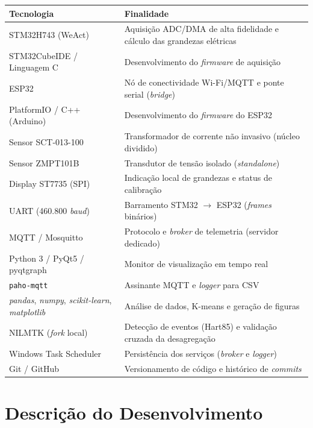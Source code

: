 \documentclass[12pt,a4paper]{article}
\begin{document}
\begin{longtable}{p{5cm} p{9cm}}
\toprule
\textbf{Tecnologia} & \textbf{Finalidade} \\
\midrule
\endhead
STM32H743 (WeAct) & Aquisi\c{c}\~ao ADC/DMA de alta fidelidade e c\'alculo das grandezas el\'etricas \\
STM32CubeIDE / Linguagem C & Desenvolvimento do \textit{firmware} de aquisi\c{c}\~ao \\
ESP32 & N\'o de conectividade Wi-Fi/MQTT e ponte serial (\textit{bridge}) \\
PlatformIO / C++ (Arduino) & Desenvolvimento do \textit{firmware} do ESP32 \\
Sensor SCT-013-100 & Transformador de corrente n\~ao invasivo (n\'ucleo dividido) \\
Sensor ZMPT101B & Transdutor de tens\~ao isolado (\textit{standalone}) \\
Display ST7735 (SPI) & Indica\c{c}\~ao local de grandezas e status de calibra\c{c}\~ao \\
UART (460.800 \textit{baud}) & Barramento STM32 $\rightarrow$ ESP32 (\textit{frames} bin\'arios) \\
MQTT / Mosquitto & Protocolo e \textit{broker} de telemetria (servidor dedicado) \\
Python 3 / PyQt5 / pyqtgraph & Monitor de visualiza\c{c}\~ao em tempo real \\
\texttt{paho-mqtt} & Assinante MQTT e \textit{logger} para CSV \\
\textit{pandas}, \textit{numpy}, \textit{scikit-learn}, \textit{matplotlib} & An\'alise de dados, K-means e gera\c{c}\~ao de figuras \\
NILMTK (\textit{fork} local) & Detec\c{c}\~ao de eventos (Hart85) e valida\c{c}\~ao cruzada da desagrega\c{c}\~ao \\
Windows Task Scheduler & Persist\^encia dos servi\c{c}os (\textit{broker} e \textit{logger}) \\
Git / GitHub & Versionamento de c\'odigo e hist\'orico de \textit{commits}\\
\bottomrule
\end{longtable}

\section{Descri\c{c}\~ao do Desenvolvimento}
\end{document}
